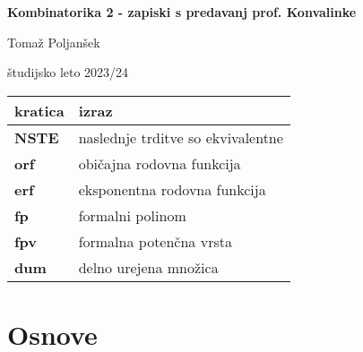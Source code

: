 \documentclass[a4paper, 12pt]{book}
\title{\ttitle}
\author{\tauthor}
\date{\tdate}
\newcommand{\ttitle}{Kombinatorika 2 - zapiski s predavanj prof. Konvalinke}
\newcommand{\tauthor}{Tomaž Poljanšek}
\newcommand{\tdate}{študijsko leto 2023/24}
\theoremstyle{definition}
\theoremstyle{remark}
\newcommand\mymaketitle{
  \begin{titlepage}
    \begin{center}
        \vspace*{4cm}
        \Huge
        \textbf{\ttitle}
                        
        \vspace{1.5cm}
        \huge
        \tauthor
            
        \vspace{3cm}
        \Large
        \tdate
    \end{center}
  \end{titlepage}
}
\begin{document}
\renewcommand{\thepage}{}
\newcommand{\sn}[1]{"`#1"'}

\mymaketitle

\clearpage

\frontmatter

\pagestyle{empty}
\def\thepage{}
\tableofcontents{}

\def\x{\hspace{3ex}}    %
\def\y{\hspace{2.45ex}}  %
\def\z{\hspace{1.9ex}}    %
\stackMath



\noindent\begin{tabular}{p{}|p{}}
  {\bf kratica} & izraz \\ \hline
  {\bf NSTE} & naslednje trditve so ekvivalentne \\
  {\bf orf} & običajna rodovna funkcija \\
  {\bf erf} & eksponentna rodovna funkcija \\
  {\bf fp} & formalni polinom \\
  {\bf fpv} & formalna potenčna vrsta \\
  {\bf dum} & delno urejena množica \\
\end{tabular}




\mainmatter
\setcounter{page}{1}
\pagestyle{fancy}





\chapter{Osnove}
\end{document}
